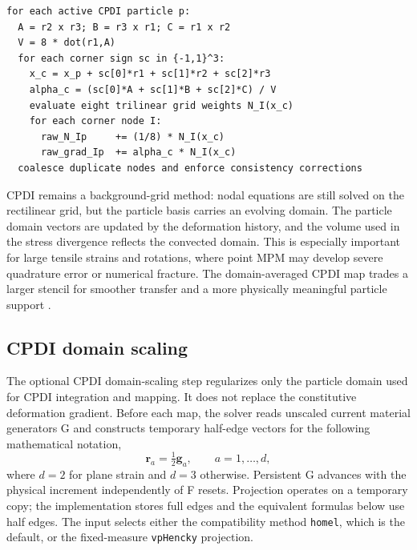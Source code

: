 \begin{lstlisting}[caption={CPDI map construction for a parallelepiped particle domain.},basicstyle=\ttfamily\small]
for each active CPDI particle p:
  A = r2 x r3; B = r3 x r1; C = r1 x r2
  V = 8 * dot(r1,A)
  for each corner sign sc in {-1,1}^3:
    x_c = x_p + sc[0]*r1 + sc[1]*r2 + sc[2]*r3
    alpha_c = (sc[0]*A + sc[1]*B + sc[2]*C) / V
    evaluate eight trilinear grid weights N_I(x_c)
    for each corner node I:
      raw_N_Ip     += (1/8) * N_I(x_c)
      raw_grad_Ip  += alpha_c * N_I(x_c)
  coalesce duplicate nodes and enforce consistency corrections
\end{lstlisting}

CPDI remains a background-grid method: nodal equations are still solved on the rectilinear grid, but the particle basis carries an evolving domain.  The particle domain vectors are updated by the deformation history, and the volume used in the stress divergence reflects the convected domain.  This is especially important for large tensile strains and rotations, where point MPM may develop severe quadrature error or numerical fracture.  The domain-averaged CPDI map trades a larger stencil for smoother transfer and a more physically meaningful particle support \cite{sadeghirad2011cpdi,homel2016domaindef}.

\subsection{CPDI domain scaling}
\label{subsec:cpdi-domain-scaling}

The optional CPDI domain-scaling step regularizes only the particle domain used for CPDI integration and mapping.  It does not replace the constitutive deformation gradient.  Before each map, the solver reads unscaled current material generators G and constructs temporary half-edge vectors for the following mathematical notation,
\begin{equation}
  \boldsymbol{r}_{a}=\tfrac12\boldsymbol{g}_{a},
  \qquad a=1,\ldots,d,
  \label{eq:cpdi-raw-domain-from-f}
\end{equation}
where $d=2$ for plane strain and $d=3$ otherwise. Persistent G advances with the physical increment independently of F resets. Projection operates on a temporary copy; the implementation stores full edges and the equivalent formulas below use half edges.  The input  selects either the compatibility method \texttt{homel}, which is the default, or the fixed-measure \texttt{vpHencky} projection.

